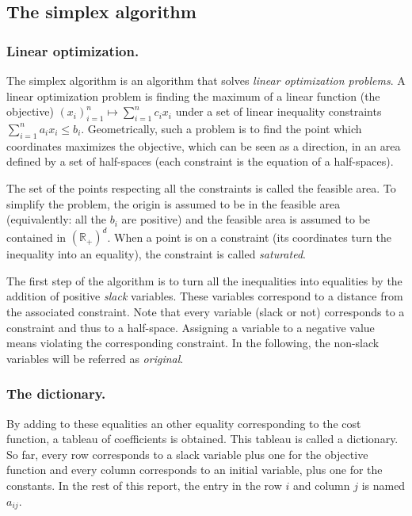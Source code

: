 \subsection{The simplex algorithm}

\subsubsection{Linear optimization.}
The simplex algorithm is an algorithm that solves \emph{linear optimization problems}. A linear optimization problem is finding the maximum of a linear function (the objective) $(x_i)_{i=1}^n \mapsto \sum_{i=1}^n c_i x_i$  under a set of linear inequality constraints $\sum_{i=1}^n a_i x_i \leq b_i$. Geometrically, such a problem is to find the point which coordinates maximizes the objective, which can be seen as a direction, in an area defined by a set of half-spaces (each constraint is the equation of a half-spaces).

The set of the points respecting all the constraints is called the feasible area. To simplify the problem, the origin is assumed to be in the feasible area (equivalently: all the $b_i$ are positive) and the feasible area is assumed to be contained in $(\mathbb{R}_+)^d$. When a point is on a constraint (its coordinates turn the inequality into an equality), the constraint is called \emph{saturated}. 

The first step of the algorithm is to turn all the inequalities into equalities by the addition of positive \emph{slack} variables. These variables correspond to a distance from the associated constraint. Note that every variable (slack or not) corresponds to a constraint and thus to a half-space. Assigning a variable to a negative value means violating the corresponding constraint. In the following, the non-slack variables will be referred as \emph{original}.

\subsubsection{The dictionary.}
By adding to these equalities an other equality corresponding to the cost function, a tableau of coefficients is obtained. This tableau is called a dictionary. So far, every row corresponds to a slack variable plus one for the objective function and every column corresponds to an initial variable, plus one for the constants. In the rest of this report, the entry in the row $i$ and column $j$ is named $a_{ij}$.


